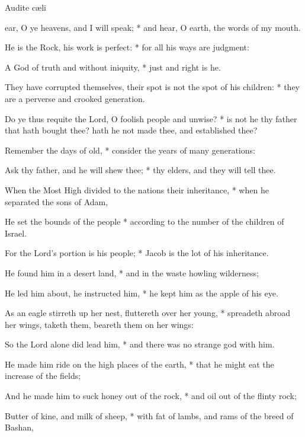 \begin{multicols}{2}
\begin{inhead}
Audite c{\ae}li
\end{inhead}

 ear, O ye heavens, and I will speak; * and hear, O earth, the words of my mouth.\par
{}
He is the Rock, his work is perfect: * for all his ways are judgment:\par
A God of truth and without iniquity, * just and right is he.\par
They have corrupted themselves, {\dag} their spot is not the spot of his children: * they are a perverse and crooked generation.\par
Do ye thus requite the Lord, O foolish people and unwise? * is not he thy father that hath bought thee? hath he not made thee, and established thee?\par
Remember the days of old, * consider the years of many generations:\par
Ask thy father, and he will shew thee; * thy elders, and they will tell thee.\par
When the Most High divided to the nations their inheritance, * when he separated the sons of Adam,\par
He set the bounds of the people * according to the number of the children of Israel.\par
For the Lord's portion is his people; * Jacob is the lot of his inheritance.\par
He found him in a desert land, * and in the waste howling wilderness;\par
He led him about, he instructed him, * he kept him as the apple of his eye.\par
As an eagle stirreth up her nest, fluttereth over her young, * spreadeth abroad her wings, taketh them, beareth them on her wings:\par
So the Lord alone did lead him, * and there was no strange god with him.\par
He made him ride on the high places of the earth, * that he might eat the increase of the fields;\par
And he made him to suck honey out of the rock, * and oil out of the flinty rock;\par
Butter of kine, and milk of sheep, * with fat of lambs, and rams of the breed of Bashan,\par

\end{multicols}
